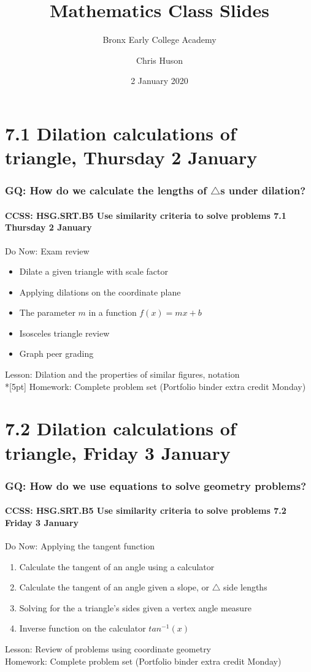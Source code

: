\documentclass{beamer}
\title{Mathematics Class Slides}
\subtitle{Bronx Early College Academy}
\author{Chris Huson}
\date{2 January 2020}
\begin{document}
\frame{\titlepage}
\section[Outline]{}
\frame{\tableofcontents}


\section{7.1 Dilation calculations of triangle, Thursday 2 January}
\frame
{
  \frametitle{GQ: How do we calculate the lengths of $\triangle$s under dilation?}
  \framesubtitle{CCSS: HSG.SRT.B5 Use similarity criteria to solve problems \hfill \alert{7.1 Thursday 2 January}}

  \begin{block}{Do Now: Exam review}
  \begin{itemize}
    \item Dilate a given triangle with scale factor
    \item Applying dilations on the coordinate plane
    \item The parameter $m$ in a function $f(x)=mx+b$
    \item Isosceles triangle review
    \item Graph peer grading
  \end{itemize}
  \end{block}
  Lesson: Dilation and the properties of similar figures, notation\\*[5pt]
  Homework: Complete problem set (Portfolio binder extra credit Monday)
}

\section{7.2 Dilation calculations of triangle, Friday 3 January}
\frame
{
  \frametitle{GQ: How do we use equations to solve geometry problems?}
  \framesubtitle{CCSS: HSG.SRT.B5 Use similarity criteria to solve problems \hfill \alert{7.2 Friday 3 January}}

  \begin{block}{Do Now: Applying the tangent function}
  \begin{enumerate}
    \item Calculate the tangent of an angle using a calculator
    \item Calculate the tangent of an angle given a slope, or $\triangle$ side lengths
    \item Solving for the a triangle's sides given a vertex angle measure
    \item Inverse function on the calculator $tan^{-1}(x)$
  \end{enumerate}
  \end{block}
  Lesson: Review of problems using coordinate geometry \\
  Homework: Complete problem set (Portfolio binder extra credit Monday)
}
\end{document}
